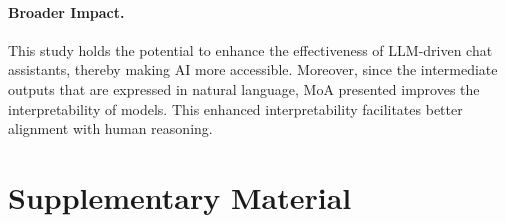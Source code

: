 \documentclass{article}
\begin{document}
\paragraph{Broader Impact.}
This study holds the potential to enhance the effectiveness of LLM-driven chat assistants, thereby making AI more accessible. 
Moreover, since the intermediate outputs that are expressed in natural language, MoA presented improves the interpretability of models.
This enhanced interpretability facilitates better alignment with human reasoning.


\newpage





\appendix

\section*{Supplementary Material}


\end{document}
